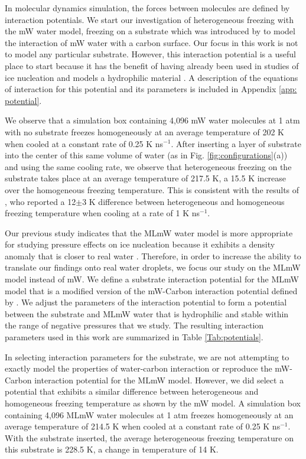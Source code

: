 \documentclass[journal abbreviation, manuscript]{copernicus}
\begin{document}
In molecular dynamics simulation, the forces between molecules are defined by interaction potentials. We start our investigation of heterogeneous freezing with the mW water model, freezing on a substrate which was introduced by \citet{lupi2014} to model the interaction of mW water with a carbon surface. Our focus in this work is not to model any particular substrate. However, this interaction potential is a useful place to start because it has the benefit of having already been used in studies of ice nucleation and models a hydrophilic material \citep{lupi2014, Bi2016}. A description of the equations of interaction for this potential and its parameters is included in Appendix \ref{app: potential}.

We observe that a simulation box containing 4,096 mW water molecules at 1 atm with no substrate freezes homogeneously at an average temperature of 202 K when cooled at a constant rate of 0.25 K ns$^{-1}$. After inserting a layer of substrate into the center of this same volume of water (as in Fig. \ref{fig:configurations}(a)) and using the same cooling rate, we observe that heterogeneous freezing on the substrate takes place at an average temperature of 217.5 K, a 15.5 K increase over the homogeneous freezing temperature. This is consistent with the results of \citet{lupi2014}, who reported a 12$\pm$3 K difference between heterogeneous and homogeneous freezing temperature when cooling at a rate of 1 K ns$^{-1}$.

Our previous study \citep{rosky2022} indicates that the MLmW water model is more appropriate for studying pressure effects on ice nucleation because it exhibits a density anomaly that is closer to real water \citep{chan2019}. Therefore, in order to increase the ability to translate our findings onto real water droplets, we focus our study on the MLmW model instead of mW. We define a substrate interaction potential for the MLmW model that is a modified version of the mW-Carbon interaction potential defined by \citet{lupi2014}. We adjust the parameters of the interaction potential to form a potential between the substrate and MLmW water that is hydrophilic and stable within the range of negative pressures that we study. The resulting interaction parameters used in this work are summarized in Table \ref{Tab:potentials}.

In selecting interaction parameters for the substrate, we are not attempting to exactly model the properties of water-carbon interaction or reproduce the mW-Carbon interaction potential for the MLmW model. However, we did select a potential that exhibits a similar difference between heterogeneous and homogeneous freezing temperature as shown by the mW model. A simulation box containing 4,096 MLmW water molecules at 1 atm freezes homogeneously at an average temperature of 214.5 K when cooled at a constant rate of 0.25 K ns$^{-1}$. With the substrate inserted, the average heterogeneous freezing temperature on this substrate is 228.5 K, a change in temperature of 14 K. 
\end{document}
